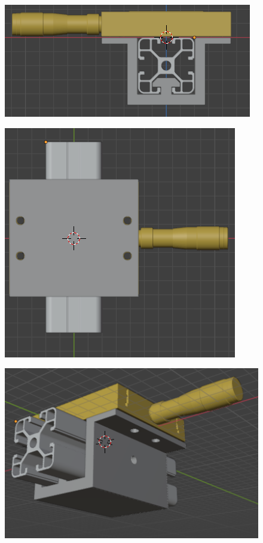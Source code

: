 \begin{figure}
	\centering
	\includegraphics[width=0.7\linewidth]{Figures/21_04_2025/Vista_lateral_tornillo_perfil}
	\caption{}
	\label{fig:vistalateraltornilloperfil1}
\end{figure}

\begin{figure}
	\centering
	\includegraphics[width=0.7\linewidth]{Figures/21_04_2025/Vista_trasera_tornillo_perfil}
	\caption{}
	\label{fig:vistatraseratornilloperfil}
\end{figure}

\begin{figure}
	\centering
	\includegraphics[width=0.7\linewidth]{Figures/21_04_2025/Vista_3_4_tornillo_perfil1}
	\caption{}
	\label{fig:vista34tornilloperfil1}
\end{figure}